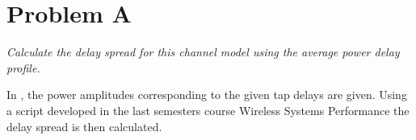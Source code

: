 \section{Problem A}
\textit{Calculate the delay spread for this channel model using the average power delay profile.}

In , the power amplitudes corresponding to the given tap delays are given. Using a script developed in the last semesters course Wireless Systems Performance the delay spread is then calculated.
